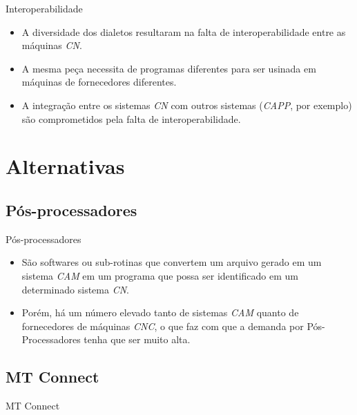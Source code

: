 \documentclass[aspectratio=169]{beamer}
\begin{document}
{\begin{frame}{Interoperabilidade}
\begin{itemize}
    \item {
      A diversidade dos dialetos resultaram na falta de interoperabilidade
      entre as máquinas \emph{CN}.
    }

    \item {
      A mesma pe\c ca necessita de programas diferentes para ser usinada 
      em m\'aquinas de fornecedores diferentes.
    }

    \item {
      A integração entre os sistemas \emph{CN} com outros sistemas 
      (\emph{CAPP}, por exemplo) são comprometidos pela falta de 
      interoperabilidade.
    }

  \end{itemize}   

\end{frame}


\section{Alternativas}


\subsection{Pós-processadores}

\begin{frame}{Pós-processadores}

  \begin{itemize}

    \item {
      São softwares ou sub-rotinas 
      que convertem um arquivo gerado em um sistema \emph{CAM} 
      em um programa que possa ser identificado em um 
      determinado sistema \emph{CN}.
    }
    
    \item {
      Porém, há um número elevado tanto de sistemas
      \emph{CAM} quanto de fornecedores de máquinas \emph{CNC}, 
      o que faz com que a demanda por Pós-Processadores
      tenha que ser muito alta.
    }

  \end{itemize}   

\end{frame}


\subsection{MT Connect}

\begin{frame}{MT Connect}


\end{frame}}
\end{document}
